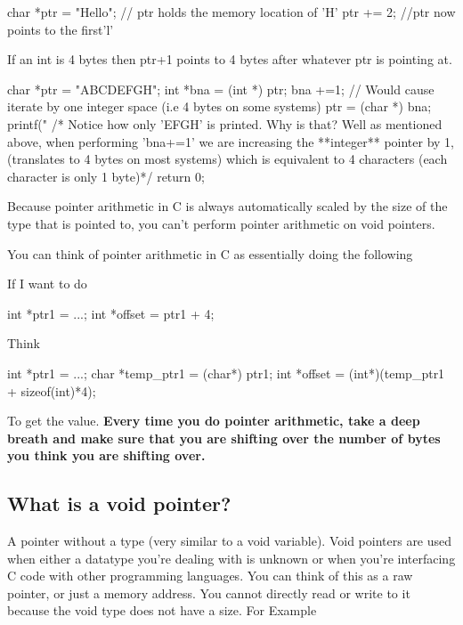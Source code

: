 \begin{code}[language=C]
char *ptr = "Hello"; // ptr holds the memory location of 'H'
ptr += 2; //ptr now points to the first'l'
\end{code}

If an int is 4 bytes then ptr+1 points to 4 bytes after whatever ptr is
pointing at.

\begin{code}[language=C]
char *ptr = "ABCDEFGH";
int *bna = (int *) ptr;
bna +=1; // Would cause iterate by one integer space (i.e 4 bytes on some systems)
ptr = (char *) bna;
printf("%
/* Notice how only 'EFGH' is printed. Why is that? Well as mentioned above, when performing 'bna+=1' we are increasing the **integer** pointer by 1, (translates to 4 bytes on most systems) which is equivalent to 4 characters (each character is only 1 byte)*/
return 0;
\end{code}

Because pointer arithmetic in C is always automatically scaled by the
size of the type that is pointed to, you can't perform pointer
arithmetic on void pointers.

You can think of pointer arithmetic in C as essentially doing the
following

If I want to do

\begin{code}[language=C]
int *ptr1 = ...;
int *offset = ptr1 + 4;
\end{code}

Think

\begin{code}[language=C]
int *ptr1 = ...;
char *temp_ptr1 = (char*) ptr1;
int *offset = (int*)(temp_ptr1 + sizeof(int)*4);
\end{code}

To get the value. \textbf{Every time you do pointer arithmetic, take a
deep breath and make sure that you are shifting over the number of bytes
you think you are shifting over.}

\subsection{What is a void pointer?}

A pointer without a type (very similar to a void variable). Void pointers are used when either a datatype you're dealing with is unknown or when you're interfacing C code with other programming languages. You can think of this as a raw pointer, or just a memory address. You cannot directly read or write to it because the void type does not have a size. For Example

